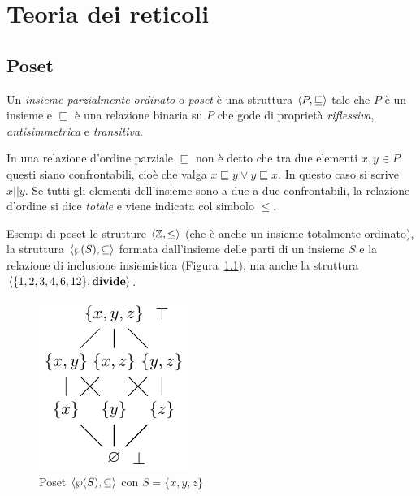 \newcommand{\uco}{\fun{uco}}
\newcommand{\lfp}{\fun{lfp}}
\newcommand{\wide}{\nabla}

\chapter{Teoria dei reticoli}\label{chap:teoriareticoli}

\section{Poset}

\begin{definition}[Poset]
Un \emph{insieme parzialmente ordinato} o \emph{poset} è una struttura $\langle P, \sqsubseteq \rangle$ tale che $P$ è un insieme e $\sqsubseteq$ è una relazione binaria su $P$ che gode di proprietà \emph{riflessiva}, \emph{antisimmetrica} e \emph{transitiva}. 
\end{definition}

In una relazione d'ordine parziale $\sqsubseteq$ non è detto che tra due elementi $x,y \in P$ questi siano confrontabili, cioè che valga $x \sqsubseteq y \lor y \sqsubseteq x$. In questo caso si scrive $x || y$. Se tutti gli elementi dell'insieme sono a due a due confrontabili, la relazione d'ordine si dice \emph{totale} e viene indicata col simbolo $\le$. 

Esempi di poset le strutture $\langle \mathbb{Z}, \le \rangle$ (che è anche un insieme totalmente ordinato), la struttura $\langle \wp(S), \subseteq \rangle$ formata dall'insieme delle parti di un insieme $S$ e la relazione di inclusione insiemistica (Figura~\ref{fig:poset-parti}), ma anche la struttura $\langle \{1,2,3,4,6,12\}, \mathbf{divide} \rangle$.

\begin{figure}[htbp]
    \centering
    \includegraphics{appendici/immagini/poset-parti.pdf}
    \caption{Poset $\langle \wp(S), \subseteq \rangle$ con $S = \{x,y,z\}$}
    \label{fig:poset-parti}
\end{figure}


